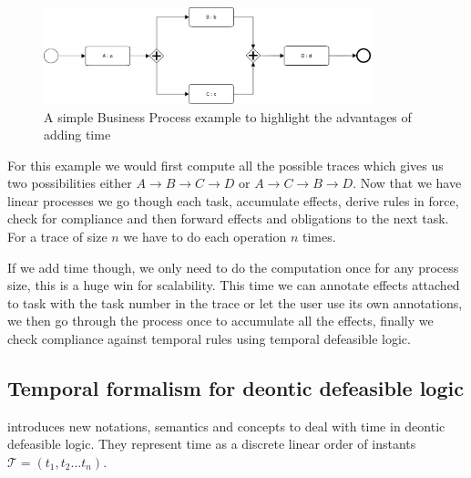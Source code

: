 \documentclass[10pt]{report}
\begin{document}
\begin{figure}[!h] %
\begin{center}
\includegraphics[width=0.85\textwidth]{temporalExample1.png} %
\caption{A simple Business Process example to highlight the advantages of adding time} %
\end{center}
\end{figure} %

For this example we would first compute all the possible traces which gives us two possibilities either $A \rightarrow B \rightarrow C \rightarrow D$ or $A \rightarrow C \rightarrow B \rightarrow D$. Now that we have linear processes we go though each task, accumulate effects, derive rules in force, check for compliance and then forward effects and obligations to the next task. For a trace of size $n$ we have to do each operation $n$ times.

If we add time though, we only need to do the computation once for any process size, this is a huge win for scalability. This time we can annotate effects attached to task with the task number in the trace or let the user use its own annotations, we then go through the process once to accumulate all the effects, finally we check compliance against temporal rules using temporal defeasible logic.


\subsection{Temporal formalism for deontic defeasible logic}

\autocite{JusticeDelayed2011} introduces new notations, semantics and concepts to deal with time in deontic defeasible logic. They represent time as a discrete linear order of instants $ \mathscr{T} = (t_{1}, t_{2} ... t_{n})$.
\end{document}
